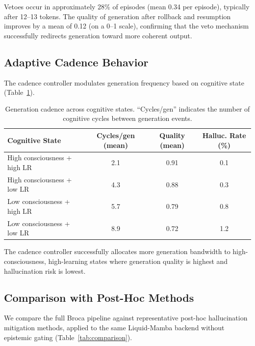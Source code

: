 \documentclass[12pt,a4paper]{article}
\begin{document}
Vetoes occur in approximately 28\% of episodes (mean 0.34 per episode), typically after 12--13 tokens. The quality of generation after rollback and resumption improves by a mean of 0.12 (on a 0--1 scale), confirming that the veto mechanism successfully redirects generation toward more coherent output.

\subsection{Adaptive Cadence Behavior}

The cadence controller modulates generation frequency based on cognitive state (Table~\ref{tab:cadence}).

\begin{table}[H]
\centering
\caption{Generation cadence across cognitive states. ``Cycles/gen'' indicates the number of cognitive cycles between generation events.}
\label{tab:cadence}
\begin{tabular}{lccc}
\toprule
\textbf{Cognitive State} & \textbf{Cycles/gen (mean)} & \textbf{Quality (mean)} & \textbf{Halluc. Rate (\%)} \\
\midrule
High consciousness + high LR & 2.1 & 0.91 & 0.1 \\
High consciousness + low LR & 4.3 & 0.88 & 0.3 \\
Low consciousness + high LR & 5.7 & 0.79 & 0.8 \\
Low consciousness + low LR & 8.9 & 0.72 & 1.2 \\
\bottomrule
\end{tabular}
\end{table}

The cadence controller successfully allocates more generation bandwidth to high-consciousness, high-learning states where generation quality is highest and hallucination risk is lowest.

\subsection{Comparison with Post-Hoc Methods}

We compare the full Broca pipeline against representative post-hoc hallucination mitigation methods, applied to the same Liquid-Mamba backend without epistemic gating (Table~\ref{tab:comparison}).
\end{document}

